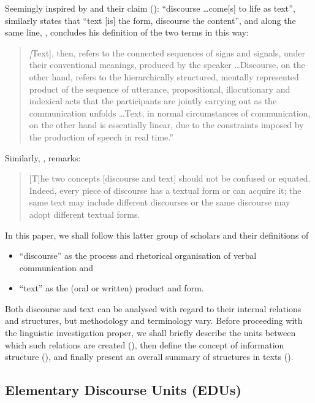 \documentclass[output=paper]{LSP/langsci}
\begin{document}
Seemingly inspired by \citeauthor{Hasan1976} and their claim (\citeyear[300]{Hasan1976}): ``discourse \ldots come[s] to life as text'', \citet[34]{Christiansen2011} similarly states that ``text [is] the form, discourse the content'', and along the same line, \citet[99-100]{Cornish2009}, concludes his definition of the two terms in this way: 

\begin{quote}
\textit[Text], then, refers to the connected sequences of signs and signals, under their conventional meanings, produced by the speaker \ldots Discourse, on the other hand, refers to the hierarchically structured, mentally represented product of the sequence of utterance, propositional, illocutionary and indexical acts that the participants are jointly carrying out as the communication unfolds \ldots Text, in normal circumstances of communication, on the other hand is essentially linear, due to the constraints imposed by the production of speech in real time.''
\end{quote}

Similarly, \citet[4]{Ruiz2009}, remarks:
\begin{quote}
[T]he two concepts [discourse and text] should not be confused or equated. Indeed, every piece of discourse has a textual form or can acquire it; the same text may include different discourses or the same discourse may adopt different textual forms.
\end{quote}

In this paper, we shall follow this latter group of scholars and their definitions of

\begin{itemize}
\item ``discourse'' as the process and rhetorical organisation of verbal communication and 
\item ``text'' as the (oral or written) product and form. 
\end{itemize}

Both discourse and text can be analysed with regard to their internal relations and structures, but methodology and terminology vary. Before proceeding with the linguistic investigation proper, we shall briefly describe the units between which such relations are created (), then define the concept of information structure (), and finally present an overall summary of structures in texts ().

\subsection{Elementary Discourse Units (EDUs)}\label{sec:korzen:2.2}
\end{document}
